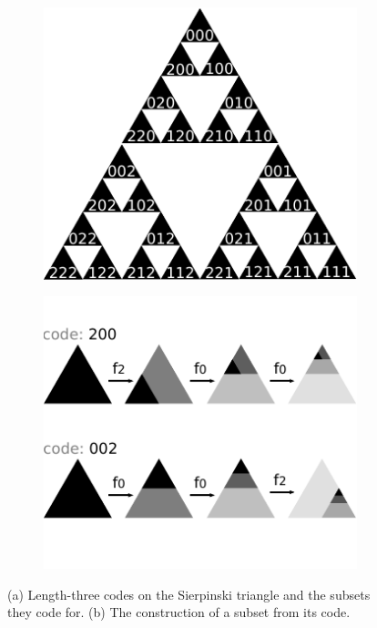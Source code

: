 \documentclass[10pt,a4paper,oneside]{article}
\theoremstyle{definition}
\begin{document}
\begin{figure}[b!]
  \centering
  \begin{subfigure}[b]{0.48\textwidth}
    \includegraphics[width=\textwidth]{../img/sierpinski-codes.pdf}
    \caption{}
    \label{fig:sierpinski-codes}
  \end{subfigure}  
  \hspace{0.015\textwidth}
  \begin{subfigure}[b]{0.48\textwidth}
    \includegraphics[width=\textwidth]{../img/code-construction.pdf}
    \caption{}
    \label{fig:code-construction}
  \end{subfigure}

  \caption{\small (a) Length-three codes on the Sierpinski triangle and the subsets they code for. (b) The construction of a subset from its code.}
  \label{fig:codes}
\end{figure}
\end{document}
